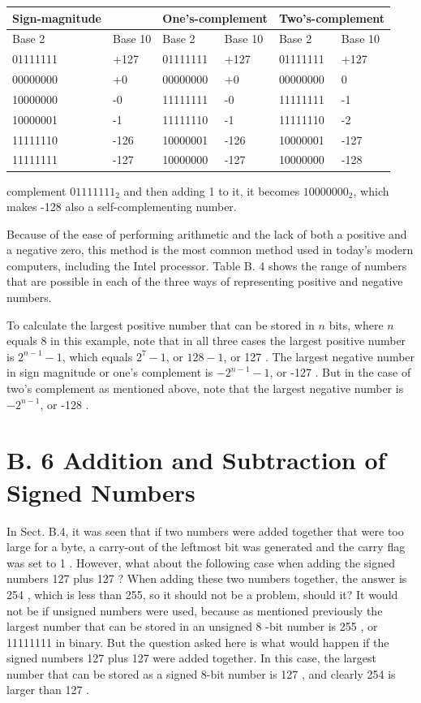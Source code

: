 \documentclass[10pt]{article}
\begin{document}
\begin{center}
\begin{tabular}{|l|l|l|l|l|l|}
\hline
Sign-magnitude &  & \multicolumn{2}{|l|}{One's-complement} & \multicolumn{2}{l|}{Two's-complement} \\
\hline
Base 2 & Base 10 & Base 2 & Base 10 & Base 2 & Base 10 \\
\hline
01111111 & +127 & 01111111 & +127 & 01111111 & +127 \\
\hline
00000000 & +0 & 00000000 & +0 & 00000000 & 0 \\
\hline
10000000 & -0 & 11111111 & -0 & 11111111 & -1 \\
\hline
10000001 & -1 & 11111110 & -1 & 11111110 & -2 \\
\hline
11111110 & -126 & 10000001 & -126 & 10000001 & -127 \\
\hline
11111111 & -127 & 10000000 & -127 & 10000000 & -128 \\
\hline
\end{tabular}
\end{center}

complement $01111111_{2}$ and then adding 1 to it, it becomes $10000000_{2}$, which makes -128 also a self-complementing number.

Because of the ease of performing arithmetic and the lack of both a positive and a negative zero, this method is the most common method used in today's modern computers, including the Intel processor. Table B. 4 shows the range of numbers that are possible in each of the three ways of representing positive and negative numbers.

To calculate the largest positive number that can be stored in $n$ bits, where $n$ equals 8 in this example, note that in all three cases the largest positive number is $2^{n-1}-1$, which equals $2^{7}-1$, or $128-1$, or 127 . The largest negative number in sign magnitude or one's complement is $-2^{n-1}-1$, or -127 . But in the case of two's complement as mentioned above, note that the largest negative number is $-2^{n-1}$, or -128 .

\section*{B. 6 Addition and Subtraction of Signed Numbers}
In Sect. B.4, it was seen that if two numbers were added together that were too large for a byte, a carry-out of the leftmost bit was generated and the carry flag was set to 1 . However, what about the following case when adding the signed numbers 127 plus 127 ? When adding these two numbers together, the answer is 254 , which is less than 255, so it should not be a problem, should it? It would not be if unsigned numbers were used, because as mentioned previously the largest number that can be stored in an unsigned 8 -bit number is 255 , or 11111111 in binary. But the question asked here is what would happen if the signed numbers 127 plus 127 were added together. In this case, the largest number that can be stored as a signed 8-bit number is 127 , and clearly 254 is larger than 127 .
\end{document}

